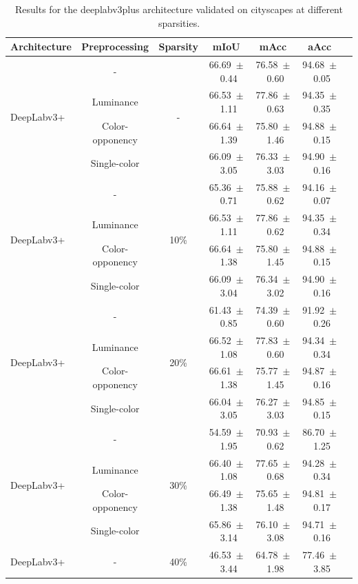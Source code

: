 \begin{table}[h]
\centering
\caption{Results for the deeplabv3plus architecture validated on cityscapes at different sparsities.}
\begin{tabular}{@{}lccc ccc@{}}
\toprule
Architecture & Preprocessing & Sparsity & mIoU & mAcc & aAcc \\
\midrule

\multirow{4}{*}{DeepLabv3+} & - & \multirow{4}{*}{-} & 66.69~$\pm$~0.44 & 76.58~$\pm$~0.60 & 94.68~$\pm$~0.05 \\
& Luminance & & 66.53~$\pm$~1.11 & 77.86~$\pm$~0.63 & 94.35~$\pm$~0.35 \\
& Color-opponency & & 66.64~$\pm$~1.39 & 75.80~$\pm$~1.46 & 94.88~$\pm$~0.15 \\
& Single-color & & 66.09~$\pm$~3.05 & 76.33~$\pm$~3.03 & 94.90~$\pm$~0.16 \\
\midrule
\multirow{4}{*}{DeepLabv3+} & - & \multirow{4}{*}{10\%} & 65.36~$\pm$~0.71 & 75.88~$\pm$~0.62 & 94.16~$\pm$~0.07 \\
& Luminance & & 66.53~$\pm$~1.11 & 77.86~$\pm$~0.62 & 94.35~$\pm$~0.34 \\
& Color-opponency & & 66.64~$\pm$~1.38 & 75.80~$\pm$~1.45 & 94.88~$\pm$~0.15 \\
& Single-color & & 66.09~$\pm$~3.04 & 76.34~$\pm$~3.02 & 94.90~$\pm$~0.16 \\
\midrule
\multirow{4}{*}{DeepLabv3+} & - & \multirow{4}{*}{20\%} & 61.43~$\pm$~0.85 & 74.39~$\pm$~0.60 & 91.92~$\pm$~0.26 \\
& Luminance & & 66.52~$\pm$~1.08 & 77.83~$\pm$~0.60 & 94.34~$\pm$~0.34 \\
& Color-opponency & & 66.61~$\pm$~1.38 & 75.77~$\pm$~1.45 & 94.87~$\pm$~0.16 \\
& Single-color & & 66.04~$\pm$~3.05 & 76.27~$\pm$~3.03 & 94.85~$\pm$~0.15 \\
\midrule
\multirow{4}{*}{DeepLabv3+} & - & \multirow{4}{*}{30\%} & 54.59~$\pm$~1.95 & 70.93~$\pm$~0.62 & 86.70~$\pm$~1.25 \\
& Luminance & & 66.40~$\pm$~1.08 & 77.65~$\pm$~0.68 & 94.28~$\pm$~0.34 \\
& Color-opponency & & 66.49~$\pm$~1.38 & 75.65~$\pm$~1.48 & 94.81~$\pm$~0.17 \\
& Single-color & & 65.86~$\pm$~3.14 & 76.10~$\pm$~3.08 & 94.71~$\pm$~0.16 \\
\midrule
\multirow{4}{*}{DeepLabv3+} & - & \multirow{4}{*}{40\%} & 46.53~$\pm$~3.44 & 64.78~$\pm$~1.98 & 77.46~$\pm$~3.85 \\

\end{tabular}
\end{table}
